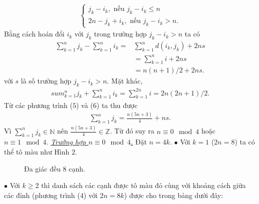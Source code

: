 \begin{multicols}{2}
\begin{align*}
		\begin{cases}
			j_k-i_k, \text{ nếu } j_k-i_k \le n \\
			2n- j_k + i_k, \text{ nếu } j_k-i_k > n.
		\end{cases} \tag{$4$}
	\end{align*}
	Bằng cách hoán đổi $i_k$ với $j_k$ trong trường hợp $j_k-i_k > n$ ta có 
	\begin{align} 
			\sum_{k=1}^{n}j_k - \sum_{k=1}^n i_k = & \sum_{k=1}^nd(i_k,j_k) + 2ns \nonumber \\
			& = \sum_{k=1}^ni + 2ns \nonumber \\
			& = n(n+1)/2 + 2ns.\tag{$5$}
		\end{align}
		với $s$ là số trường hợp $j_k-i_k > n$. Mặt khác,
		\begin{align*}
			sum_{k=1}^nj_k + \sum_{k=1}^ni_k = \sum_{k=1}^{2n}i = 2n(2n+1)/2. \tag{$6$}
		\end{align*}
		Từ các phương trình ($5$) và ($6$) ta thu được 
		\begin{align*}
			\sum_{k=1}^{n}j_k = \frac{n(5n+3)}{4} + ns.
		\end{align*}
		Vì $\sum_{k=1}^{n}j_k \in \mathbb{N}$ nên $\frac{n(5n+3)}{4} \in \mathbb{Z}$. Từ đó suy ra $n \equiv 0 \mod 4$ hoặc $n \equiv 1 \mod 4$.
		\vskip 0.1cm
		\underline{\textit{Trường hợp $n \equiv 0 \mod 4$.}} Đặt $n = 4k$.
		\vskip 0.1cm
		$\bullet$ Với $k=1$ ($2n = 8$) ta có thể tô màu như Hình $2$.
			\begin{figure}[H]
				\vspace*{-5pt}
				\centering
				\captionsetup{labelformat= empty, justification=centering}
				\caption{Đa giác đều $8$ cạnh.}
				\vspace*{-10pt}
			\end{figure}
			$\bullet$ Với $k \ge 2$ thì danh sách các cạnh được tô màu đỏ cùng với khoảng cách giữa các đỉnh (phương trình ($4$) với $2n = 8k$) được cho trong bảng dưới đây:

\end{multicols}
